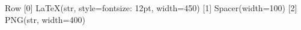 \documentclass[letterpaper,10pt,english]{sphinxmanual}
\begin{document}
\begin{sphinxVerbatim}[commandchars=\\\{\}]
   

  
\end{sphinxVerbatim}

\begin{sphinxVerbatim}[commandchars=\\\{\}]
Row
    [0] LaTeX(str, style=\PYGZob{}\PYGZsq{}font\PYGZhy{}size\PYGZsq{}: \PYGZsq{}12pt\PYGZsq{}\PYGZcb{}, width=450)
    [1] Spacer(width=100)
    [2] PNG(str, width=400)
\end{sphinxVerbatim}
\end{document}
